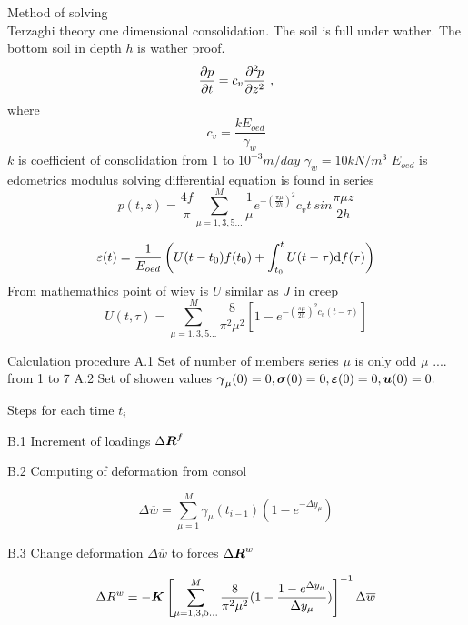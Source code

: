 Method of solving
\\
Terzaghi theory one dimensional consolidation. The soil is full under wather. The bottom
soil in depth $h$ is wather proof.
\begin{equation}
\mbox{$\displaystyle\frac{\partial{p}}{\partial{t}}$} = c_v \mbox{$\displaystyle\frac{\partial^{2}\>\!\!{p}}{\partial{z}^{2}}$}\ ,
\end{equation}
where
\begin{equation}
c_v =\frac{k E_{oed}}{\gamma_w}
\end{equation}
$k$ is coefficient of consolidation  from 1 to $10^{-3} m/day$
$\gamma_w = 10 kN/m^3$ 
$E_{oed}$ is edometrics modulus 
solving differential equation is found in series
\begin{equation}
p(t,z) = \frac{4f}{\pi} \sum_{\mu=1,3,5...}^{M} \frac{1}{\mu}
e^{-\left(\frac{\pi \mu}{2h}\right)^2} c_v t\ sin\frac{\pi \mu z}{2h}
\end{equation}

\begin{equation}
\varepsilon(t) = \frac{1}{E_{oed}} \left(U(t-t_0)f(t_0) + \int_{t_0}^{t} U(t-\tau){\rm d}f(\tau)\right)
\end{equation}
From mathemathics point of wiev is $U$ similar as $J$ in creep 
\begin{equation}
U(t,\tau) =   \sum_{\mu=1,3,5...}^{M} \frac{8}{\pi^2 \mu^2}
\left[1 - e^{-\left(\frac{\pi\mu}{2h}\right)^{2} c_v (t-\tau)}\right]
\end{equation}




Calculation procedure
A.1  Set of number of members series  $\mu$ is only odd
     $\mu$ .... from 1 to 7
A.2  Set of showen values $ \mbox{\boldmath$\gamma$}_\mu(0)=0, \mbox{\boldmath$\sigma$}(0)=0, \mbox{\boldmath$\varepsilon$}(0)=0, \mbox{\boldmath$u$}(0)=0.$

Steps for each time $t_i$

B.1  Increment of loadings $\Delta \mbox{\boldmath$R$}^f$

B.2  Computing of deformation from consol

\begin{equation}
\Delta\overline{w} = \sum_{\mu=1}^{M} {\gamma_{\mu}(t_{i-1})(1-e^{-\Delta y_\mu})}
\end{equation}

B.3  Change deformation $\Delta\overline{w}$ to forces $\Delta \mbox{\boldmath$R$}^w$

\begin{equation}
\Delta R^w = -\mbox{\boldmath$K$} \left[  \sum_{\mu=1,3,5...}^{M} \frac{8}{\pi^2 \mu^2}
(1 - \frac{1-e^{\Delta y_{\mu}}} {\Delta y_{\mu}})  \right]^{-1} \Delta\overline{w}
\end{equation}


